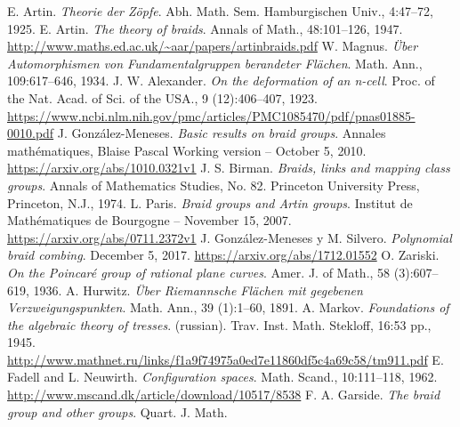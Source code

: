 \documentclass[TFG.tex]{subfiles}
\begin{document}
%

\begin{thebibliography}{}
 E. Artin. \emph{Theorie der Zöpfe}. Abh. Math. Sem. Hamburgischen Univ.,
4:47–72, 1925.
 E. Artin. \emph{The theory of braids}. Annals of Math., 48:101–126, 1947. \url{http://www.maths.ed.ac.uk/~aar/papers/artinbraids.pdf}
 W. Magnus. \emph{Über Automorphismen von Fundamentalgruppen berandeter
Flächen}. Math. Ann., 109:617–646, 1934.
 J. W. Alexander. \emph{On the deformation of an n-cell}. Proc. of the Nat.
Acad. of Sci. of the USA., 9 (12):406–407, 1923. \url{https://www.ncbi.nlm.nih.gov/pmc/articles/PMC1085470/pdf/pnas01885-0010.pdf}
 J. González-Meneses. \emph{Basic results on braid groups}. Annales mathématiques, Blaise Pascal Working version – October 5, 2010. \url{https://arxiv.org/abs/1010.0321v1}
 J. S. Birman. \emph{Braids, links and mapping class groups}. Annals of Mathematics
Studies, No. 82. Princeton University Press, Princeton, N.J.,
1974.
 L. Paris. \textit{Braid groups and Artin groups}. Institut de Mathématiques de Bourgogne – November 15, 2007. \url{https://arxiv.org/abs/0711.2372v1}
 J. González-Meneses y M. Silvero. \emph{Polynomial braid combing}. December 5, 2017. \url{https://arxiv.org/abs/1712.01552}
 O. Zariski. \emph{On the Poincaré group of rational plane curves}. Amer. J.
of Math., 58 (3):607–619, 1936.
 A. Hurwitz. \emph{Über Riemannsche Flächen mit gegebenen Verzweigungspunkten}.
Math. Ann., 39 (1):1–60, 1891.
 A. Markov. \emph{Foundations of the algebraic theory of tresses}. (russian).
Trav. Inst. Math. Stekloff, 16:53 pp., 1945. \url{http://www.mathnet.ru/links/f1a9f74975a0ed7e11860df5c4a69c58/tm911.pdf}
  E. Fadell and L. Neuwirth. \emph{Configuration spaces}. Math. Scand.,
10:111–118, 1962. \url{http://www.mscand.dk/article/download/10517/8538}
 F. A. Garside. \emph{The braid group and other groups}. Quart. J. Math.

\end{thebibliography}
\end{document}
